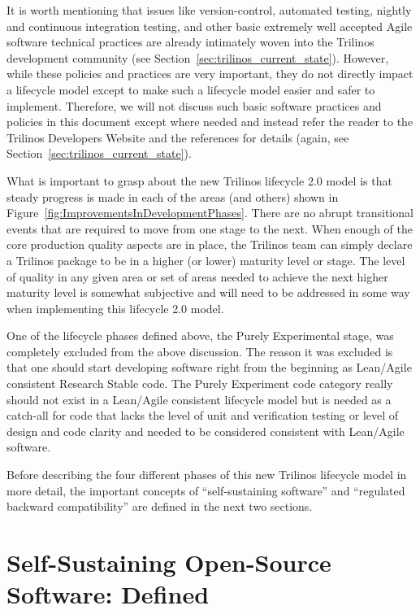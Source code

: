 \documentclass[11pt]{SANDreport}
\begin{document}
It is worth mentioning that issues like version-control, automated
testing, nightly and continuous integration testing, and other basic
extremely well accepted Agile software technical practices are
already intimately woven into the Trilinos development community (see
Section~\ref{sec:trilinos_current_state}).  However, while these
policies and practices are very important, they do not directly
impact a lifecycle model except to make such a lifecycle model easier
and safer to implement.  Therefore, we will not discuss such basic
software practices and policies in this document except where needed
and instead refer the reader to the Trilinos Developers Website and
the references for details (again, see
Section~\ref{sec:trilinos_current_state}).

What is important to grasp about the new Trilinos lifecycle 2.0 model
is that steady progress is made in each of the areas (and others)
shown in Figure~\ref{fig:ImprovementsInDevelopmentPhases}.  There are
no abrupt transitional events that are required to move from one stage
to the next.  When enough of the core production quality aspects are
in place, the Trilinos team can simply declare a Trilinos package to
be in a higher (or lower) maturity level or stage.  The level of
quality in any given area or set of areas needed to achieve the next
higher maturity level is somewhat subjective and will need to be
addressed in some way when implementing this lifecycle 2.0 model.

One of the lifecycle phases defined above, the Purely Experimental
stage, was completely excluded from the above discussion.  The reason
it was excluded is that one should start developing software right
from the beginning as Lean/Agile consistent Research Stable code.  The
Purely Experiment code category really should not exist in a
Lean/Agile consistent lifecycle model but is needed as a catch-all for
code that lacks the level of unit and verification testing or level of
design and code clarity and needed to be considered consistent with
Lean/Agile software.

Before describing the four different phases of this new Trilinos
lifecycle model in more detail, the important concepts of
``self-sustaining software'' and ``regulated backward compatibility''
are defined in the next two sections.


%
{}\section{Self-Sustaining Open-Source Software: Defined}
\label{sec:self_sustaining_open_source_software}
%
\end{document}
